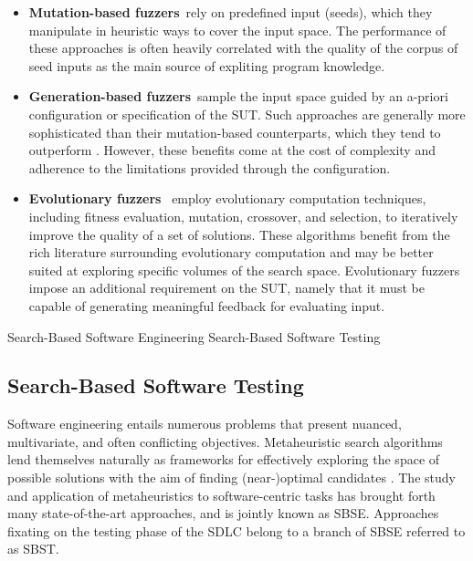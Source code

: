\begin{itemize}
\item \textbf{Mutation-based fuzzers}~rely on predefined input (seeds),
which they manipulate in heuristic ways to cover the input space.
The performance of these approaches is often heavily correlated
with the quality of the corpus of seed inputs as the main source
of expliting program knowledge.


\item \textbf{Generation-based fuzzers}~sample the input space
guided by an a-priori configuration or specification of the \gls{SUT}.
Such approaches are generally more sophisticated than their mutation-based
counterparts, which they tend to outperform \cite{saavedra2019review}.
However, these benefits come at the cost of complexity and
adherence to the limitations provided through the configuration.

\item \textbf{Evolutionary fuzzers}~ employ evolutionary computation
techniques, including fitness evaluation, mutation, crossover, and selection,
to iteratively improve the quality of a set of solutions.
These algorithms benefit from the rich literature surrounding
evolutionary computation and may be better suited at exploring
specific volumes of the search space.
Evolutionary fuzzers impose an additional requirement on the \gls{SUT},
namely that it must be capable of generating meaningful
feedback for evaluating input.
\end{itemize}

 {Search-Based Software Engineering}
 {Search-Based Software Testing}

\subsection{Search-Based Software Testing}

Software engineering entails numerous problems that present
nuanced, multivariate, and often conflicting objectives.
Metaheuristic search algorithms lend themselves naturally
as frameworks for effectively exploring the space of possible
solutions with the aim of finding (near-)optimal candidates \cite{harman2001search}.
The study and application of metaheuristics to software-centric tasks
has brought forth many state-of-the-art approaches, and is jointly known
as \Gls{SBSE}.
Approaches fixating on the testing phase of the \gls{SDLC}
belong to a branch of \gls{SBSE} referred to as \gls{SBST}.

